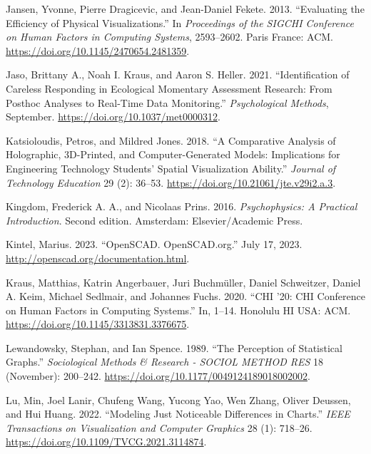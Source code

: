 \documentclass[
  letterpaper,
  DIV=11,
  numbers=noendperiod]{scrartcl}
\newlength{\cslhangindent}
\newenvironment{CSLReferences}[2] %
 {\begin{list}{}{%
  \setlength{\itemindent}{0pt}
  \setlength{\leftmargin}{0pt}
  \setlength{\parsep}{0pt}
  \ifodd #1
   \setlength{\leftmargin}{\cslhangindent}
   \setlength{\itemindent}{-1\cslhangindent}
  \fi
  \setlength{\itemsep}{#2\baselineskip}}}
 {\end{list}}
\begin{document}
\begin{CSLReferences}{1}{0}
Jansen, Yvonne, Pierre Dragicevic, and Jean-Daniel Fekete. 2013.
{``Evaluating the Efficiency of Physical Visualizations.''} In
\emph{Proceedings of the {SIGCHI Conference} on {Human Factors} in
{Computing Systems}}, 2593--2602. Paris France: ACM.
\url{https://doi.org/10.1145/2470654.2481359}.

Jaso, Brittany A., Noah I. Kraus, and Aaron S. Heller. 2021.
{``Identification of Careless Responding in Ecological Momentary
Assessment Research: {From} Posthoc Analyses to Real-Time Data
Monitoring.''} \emph{Psychological Methods}, September.
\url{https://doi.org/10.1037/met0000312}.

Katsioloudis, Petros, and Mildred Jones. 2018. {``A Comparative Analysis
of Holographic, 3D-Printed, and Computer-Generated Models: Implications
for Engineering Technology Students{'} Spatial Visualization Ability.''}
\emph{Journal of Technology Education} 29 (2): 36--53.
\url{https://doi.org/10.21061/jte.v29i2.a.3}.

Kingdom, Frederick A. A., and Nicolaas Prins. 2016. \emph{Psychophysics:
A Practical Introduction}. Second edition. Amsterdam: Elsevier/Academic
Press.

Kintel, Marius. 2023. {``{OpenSCAD}. {OpenSCAD}.org.''} July 17, 2023.
\url{http://openscad.org/documentation.html}.

Kraus, Matthias, Katrin Angerbauer, Juri Buchmüller, Daniel Schweitzer,
Daniel A. Keim, Michael Sedlmair, and Johannes Fuchs. 2020. {``CHI '20:
CHI Conference on Human Factors in Computing Systems.''} In, 1--14.
Honolulu HI USA: ACM. \url{https://doi.org/10.1145/3313831.3376675}.

Lewandowsky, Stephan, and Ian Spence. 1989. {``The Perception of
Statistical Graphs.''} \emph{Sociological Methods \& Research - SOCIOL
METHOD RES} 18 (November): 200--242.
\url{https://doi.org/10.1177/0049124189018002002}.

Lu, Min, Joel Lanir, Chufeng Wang, Yucong Yao, Wen Zhang, Oliver
Deussen, and Hui Huang. 2022. {``Modeling {Just Noticeable Differences}
in {Charts}.''} \emph{IEEE Transactions on Visualization and Computer
Graphics} 28 (1): 718--26.
\url{https://doi.org/10.1109/TVCG.2021.3114874}.


\end{CSLReferences}
\end{document}
